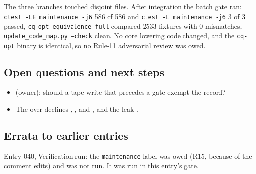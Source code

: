 The three branches touched disjoint files. After integration the batch gate ran:
\texttt{ctest -LE maintenance -j6} 586 of 586 and \texttt{ctest -L maintenance -j6} 3 of 3 passed, \texttt{cq-opt-equivalence-full} compared 2533 fixtures with 0 mismatches, \texttt{update\_code\_map.py --check} clean. No core lowering code changed, and the \texttt{cq-opt} binary is identical,
so no Rule-11 adversarial review was owed.

\subsection*{Open questions and next steps}
\begin{itemize}
  \item {} (owner): should a tape write that precedes a gate
  exempt the record?
  \item The over-declines , ,
   and , and the leak
  .
\end{itemize}

\subsection*{Errata to earlier entries}
Entry 040, Verification run: the \texttt{maintenance} label was owed (R15, because of the
 comment edits) and was not run. It was run in this entry's gate.
